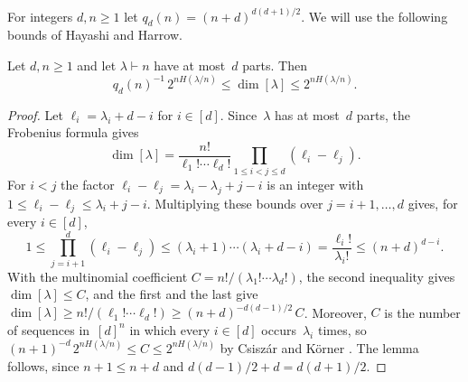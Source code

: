 \documentclass[11pt,letterpaper]{article}
\begin{document}
For integers $d, n \geq 1$ let $q_d(n) = (n + d)^{d(d+1)/2}$. We will use the following bounds of Hayashi and Harrow.

\begin{lemma}\label{lem:dim-irrep}
Let $d, n \geq 1$ and let $\lambda \vdash n$ have at most~$d$ parts. Then
\[
q_d(n)^{-1}\, 2^{nH(\lambda/n)} \leq \dim [\lambda] \leq 2^{nH(\lambda/n)}.
\]
\end{lemma}
\begin{proof}
Let $\ell_i = \lambda_i + d - i$ for $i \in [d]$. Since~$\lambda$ has at most~$d$ parts, the Frobenius formula \cite[Section~4.1, (4.11)]{MR1153249} gives
\[
\dim[\lambda] = \frac{n!}{\ell_1! \cdots \ell_d!} \prod_{1 \leq i < j \leq d} (\ell_i - \ell_j).
\]
For $i < j$ the factor $\ell_i - \ell_j = \lambda_i - \lambda_j + j - i$ is an integer with $1 \leq \ell_i - \ell_j \leq \lambda_i + j - i$. Multiplying these bounds over $j = i + 1, \ldots, d$ gives, for every $i \in [d]$,
\[
1 \leq \prod_{j=i+1}^{d} (\ell_i - \ell_j) \leq (\lambda_i + 1) \cdots (\lambda_i + d - i) = \frac{\ell_i!}{\lambda_i!} \leq (n+d)^{d-i}.
\]
With the multinomial coefficient $C = n!/(\lambda_1! \cdots \lambda_d!)$, the second inequality gives $\dim[\lambda] \leq C$, and the first and the last give $\dim[\lambda] \geq n!/(\ell_1! \cdots \ell_d!) \geq (n+d)^{-d(d-1)/2}\, C$. Moreover, $C$ is the number of sequences in~$[d]^n$ in which every $i \in [d]$ occurs~$\lambda_i$ times, so $(n+1)^{-d}\, 2^{nH(\lambda/n)} \leq C \leq 2^{nH(\lambda/n)}$ by Csisz\'ar and K\"orner \cite[Lemma~2.3]{MR2839250}. The lemma follows, since $n + 1 \leq n + d$ and $d(d-1)/2 + d = d(d+1)/2$.
\end{proof}
\end{document}
